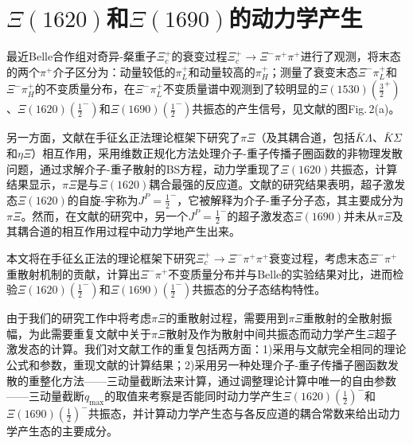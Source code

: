 \section{$\Xi(1620)$和$\Xi(1690)$的动力学产生}
最近Belle合作组对奇异-粲重子$\Xi_{c}^{+}$的衰变过程$\Xi_{c}^{+}\to\Xi^{-}\pi^{+}\pi^{+}$进行了观测\cite{PhysRevLett.122.072501}，将末态的两个$\pi^+$介子区分为：动量较低的$\pi^+_L$和动量较高的$\pi^+_H$；测量了衰变末态$\Xi^-\pi^+_L$和$\Xi^-\pi^+_H$的不变质量分布，在$\Xi^-\pi^+_L$不变质量谱中观测到了较明显的$\Xi(1530)(\frac{3}{2}^+)$、$\Xi(1620)(\frac{1}{2}^-)$和$\Xi(1690)(\frac{1}{2}^{-})$共振态的产生信号，见文献\cite{PhysRevLett.122.072501}的图Fig.\,2(a)。\par
另一方面，文献\cite{PhysRevLett.89.252001}在手征幺正法理论框架下研究了$\pi\Xi$（及其耦合道，包括$\bar{K}\Lambda$、$\bar{K}\Sigma$和$\eta\Xi$）相互作用，采用维数正规化方法处理介子-重子传播子圈函数的非物理发散问题，通过求解介子-重子散射的BS方程，动力学重现了$\Xi(1620)$共振态，计算结果显示，$\pi\Xi $是与$\Xi(1620)$耦合最强的反应道。文献\cite{PhysRevLett.89.252001}的研究结果表明，超子激发态$\Xi(1620)$的自旋-宇称为$J^P={\frac{1}{2}}^-$，它被解释为介子-重子分子态，其主要成分为$\pi\Xi$。然而，在文献\cite{PhysRevLett.89.252001}的研究中，另一个$J^P={\frac{1}{2}}^-$的超子激发态$\Xi(1690)$并未从$\pi\Xi$及其耦合道的相互作用过程中动力学地产生出来。\par
本文将在手征幺正法的理论框架下研究$\Xi_{c}^{+}\to\Xi^{-}\pi^{+}\pi^{+}$衰变过程，考虑末态$\Xi^-\pi^+$重散射机制的贡献，计算出$\Xi^-\pi^+$不变质量分布并与Belle的实验结果对比，进而检验$\Xi(1620)(\frac{1}{2}^{-})$和$\Xi(1690)(\frac{1}{2}^{-})$共振态的分子态结构特性。\par
由于我们的研究工作中将考虑$\pi\Xi$的重散射过程，需要用到$\pi\Xi$重散射的全散射振幅，为此需要重复文献\cite{PhysRevLett.89.252001}中关于$\pi\Xi$散射及作为散射中间共振态而动力学产生$\Xi $超子激发态的计算。我们对文献\cite{PhysRevLett.89.252001}工作的重复包括两方面：1)采用与文献\cite{PhysRevLett.89.252001}完全相同的理论公式和参数，重现文献\cite{PhysRevLett.89.252001}的计算结果；2)采用另一种处理介子-重子传播子圈函数发散的重整化方法——三动量截断法来计算，通过调整理论计算中唯一的自由参数——三动量截断$q_{\text{max}}$的取值来考察是否能同时动力学产生$\Xi(1620)(\frac{1}{2})^-$和$\Xi(1690)(\frac{1}{2})^-$共振态，并计算动力学产生态与各反应道的耦合常数来给出动力学产生态的主要成分。
